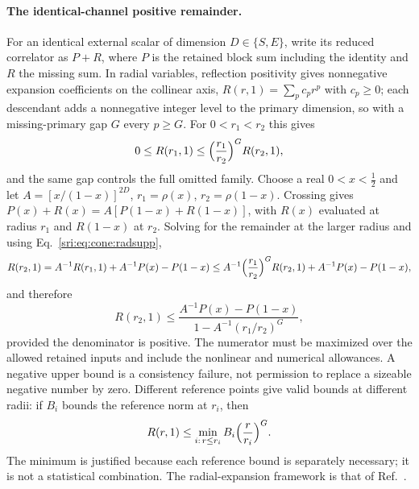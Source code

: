 \paragraph{The identical-channel positive remainder.} For an identical external scalar of dimension $D\in\{S,E\}$, write
its reduced correlator as $P+R$, where $P$ is the retained block sum including the identity and $R$ the missing sum. In
radial variables, reflection positivity gives nonnegative expansion coefficients on the collinear axis,
$R(r,1)=\sum_pc_pr^p$ with $c_p\ge0$; each descendant adds a nonnegative integer level to the primary dimension, so with
a missing-primary gap $G$ every $p\ge G$. For $0<r_1<r_2$ this gives
\begin{equation}
 0\le R(r_1,1)\le\Bigl(\frac{r_1}{r_2}\Bigr)^GR(r_2,1),
 \label{sri:eq:cone:radsupp}
\end{equation}
and the same gap controls the full omitted family. Choose a real $0<x<\frac12$ and let $A=[x/(1-x)]^{2D}$,
$r_1=\rho(x)$, $r_2=\rho(1-x)$. Crossing gives $P(x)+R(x)=A[P(1-x)+R(1-x)]$, with $R(x)$ evaluated at radius $r_1$ and
$R(1-x)$ at $r_2$. Solving for the remainder at the larger radius and using Eq.~\eqref{sri:eq:cone:radsupp},
\begin{equation}
 R(r_2,1)=A^{-1}R(r_1,1)+A^{-1}P(x)-P(1-x)\le A^{-1}\Bigl(\frac{r_1}{r_2}\Bigr)^GR(r_2,1)+A^{-1}P(x)-P(1-x),
\end{equation}
and therefore
\begin{equation}
 R(r_2,1)\le\frac{A^{-1}P(x)-P(1-x)}{1-A^{-1}(r_1/r_2)^G},
 \label{sri:eq:cone:anchor}
\end{equation}
provided the denominator is positive. The numerator must be maximized over the allowed retained inputs and include the
nonlinear and numerical allowances. A negative upper bound is a consistency failure, not permission to replace a
sizeable negative number by zero. Different reference points give valid bounds at different radii: if $B_i$ bounds the
reference norm at $r_i$, then
\begin{equation}
 R(r,1)\le\min_{i:\,r\le r_i}B_i\Bigl(\frac{r}{r_i}\Bigr)^G .
 \label{sri:eq:cone:anchormin}
\end{equation}
The minimum is justified because each reference bound is separately necessary; it is not a statistical combination.
The radial-expansion framework is that of Ref.~\cite{sri:Hogervorst:2013}.

